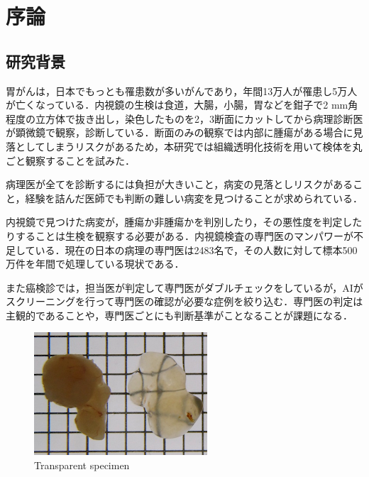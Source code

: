 \chapter{序論}
\label{chap_intro}

\section{研究背景}
胃がんは，日本でもっとも罹患数が多いがんであり，年間13万人が罹患し5万人が亡くなっている．内視鏡の生検は食道，大腸，小腸，胃などを鉗子で2 mm角程度の立方体で抜き出し，染色したものを2，3断面にカットしてから病理診断医が顕微鏡で観察，診断している．断面のみの観察では内部に腫瘍がある場合に見落としてしまうリスクがあるため，本研究では組織透明化技術を用いて検体を丸ごと観察することを試みた．

病理医が全てを診断するには負担が大きいこと，病変の見落としリスクがあること，経験を詰んだ医師でも判断の難しい病変を見つけることが求められている．

内視鏡で見つけた病変が，腫瘍か非腫瘍かを判別したり，その悪性度を判定したりすることは生検を観察する必要がある．内視鏡検査の専門医のマンパワーが不足している．現在の日本の病理の専門医は2483名\cite{pathology}で，その人数に対して標本500万件を年間で処理している現状である．

また癌検診では，担当医が判定して専門医がダブルチェックをしているが，AIがスクリーニングを行って専門医の確認が必要な症例を絞り込む．専門医の判定は主観的であることや，専門医ごとにも判断基準がことなることが課題になる．

\begin{figure}[H]
	\centering
	\includegraphics[width=0.7\linewidth]{fig/chapter1/lucid}
	\caption{Transparent specimen}
	\label{fig:lucid}
\end{figure}

